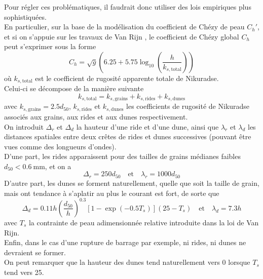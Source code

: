 \documentclass[11pt, a4paper, oneside]{report}
\begin{document}
Pour régler ces problématiques, il faudrait donc utiliser des lois empiriques plus sophistiquées. \\
En particulier, sur la base de la modélisation du coefficient de Chézy de peau $C_h'$, et si on s'appuie sur les travaux de Van Rijn \cite{van1984sediment3}, le coefficient de Chézy global $C_h$ peut s'exprimer sous la forme
\begin{equation}
    C_h = \sqrt{g} \left( 6.25 + 5.75 \log_{10} \left( \frac{h}{k_{s, \text{total}}} \right) \right)
\end{equation}
où $k_{s, \text{total}}$ est le coefficient de rugosité apparente totale de Nikuradse. \\
Celui-ci se décompose de la manière suivante
\begin{equation}
    k_{s, \text{total}} = k_{s, \text{grains}} + k_{s, \text{rides}} + k_{s, \text{dunes}}
\end{equation}
avec $k_{s, \text{grains}} = 2.5d_{50}$, $k_{s, \text{rides}}$ et $k_{s, \text{dunes}}$ les coefficients de rugosité de Nikuradse associés aux grains, aux rides et aux dunes respectivement. \\
On introduit $\Delta_r$ et $\Delta_d$ la hauteur d'une ride et d'une dune, ainsi que $\lambda_r$ et $\lambda_d$ les distances spatiales entre deux crêtes de rides et dunes successives (pouvant être vues comme des longueurs d'ondes). \\
D'une part, les rides apparaissent pour des tailles de grains médianes faibles $d_{50} < \SI{0.6}{\milli\meter}$, et on a
\begin{equation}
    \Delta_r = 250 d_{50} \quad \text{et} \quad \lambda_r = 1000d_{50}
\end{equation}
D'autre part, les dunes se forment naturellement, quelle que soit la taille de grain, mais ont tendance à s’aplatir au plus le courant est fort, de sorte que
\begin{equation}
    \Delta_d = 0.11 h \left( \frac{d_{50}}{h} \right)^{0.3} \left[ 1 - \exp \left(-0.5 T_s \right) \right] \left( 25 - T_s \right) \quad \text{et} \quad \lambda_d = 7.3 h
\end{equation}
avec $T_s$ la contrainte de peau adimensionnée relative introduite dans la loi de Van Rijn. \\
Enfin, dans le cas d'une rupture de barrage par exemple, ni rides, ni dunes ne devraient se former. \\
On peut remarquer que la hauteur des dunes tend naturellement vers 0 lorsque $T_s$ tend vers 25. \\
\end{document}
